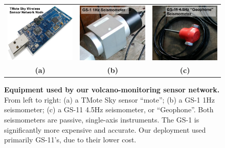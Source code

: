 \begin{figure}[t]
\begin{center}
\begin{tabular}{ccc}
\includegraphics[width=0.3\hsize]{./2-related/figs/TMoteSky.pdf} &
\includegraphics[width=0.3\hsize]{./2-related/figs/GS1.pdf} &
\includegraphics[width=0.3\hsize]{./2-related/figs/GS11.pdf} \\
\textbf{(a)} & \textbf{(b)} & \textbf{(c)} \\
\end{tabular}
\end{center}

\caption{\textbf{Equipment used by our volcano-monitoring sensor network.}
From left to right: (a) a TMote Sky sensor ``mote''; (b) a GS-1 1Hz
seismometer; (c) a GS-11 4.5Hz seismometer, or ``Geophone''. Both
seismometers are passive, single-axis instruments. The GS-1 is significantly
more expensive and accurate. Our deployment used primarily GS-11's, due to
their lower cost.}

\label{introduction-fig-equipment}
\end{figure}

